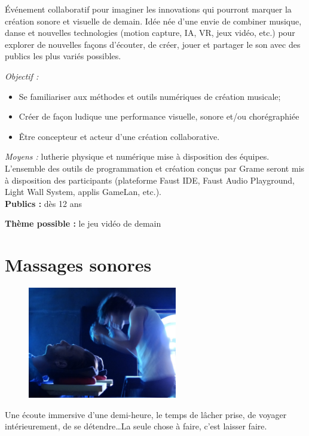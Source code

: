 \documentclass[fontsize=12pt]{scrartcl} %
\numberwithin{equation}{section} %
\numberwithin{table}{section} %
\begin{document}
Événement collaboratif pour imaginer les innovations qui pourront marquer la création sonore et visuelle de demain. Idée née d'une envie de combiner musique, danse et nouvelles technologies (motion capture, IA, VR, jeux vidéo, etc.) pour explorer de nouvelles façons d'écouter, de créer, jouer  et partager le son  avec des publics les plus variés possibles.

\textit{Objectif :}

\begin{itemize} 
\item Se familiariser aux méthodes et outils numériques de création musicale; 
\item Créer de façon ludique une performance  visuelle, sonore et/ou  chorégraphiée
\item Être concepteur et acteur d'une création collaborative.
\end{itemize}
     	 
\textit{Moyens :} lutherie physique et numérique mise à disposition des équipes. 
L'ensemble des outils de programmation et création conçus par Grame seront mis à disposition des participants (plateforme Faust IDE, Faust Audio Playground, Light Wall System, applis GameLan, etc.).\\

\noindent
\textbf{Publics :} dès 12 ans

\noindent
\textbf{Thème possible :} le jeu vidéo de demain 

\pagebreak

\section{Massages sonores}
\label{app:massage}

\begin{figure}
\centering
\includegraphics[width=6.5cm]{img/massage}
\label{fig:massage}
\end{figure}

Une écoute immersive d'une demi-heure, le temps de lâcher prise, de voyager intérieurement, de se détendre\dots La seule chose à faire, c'est laisser faire.
\end{document}
